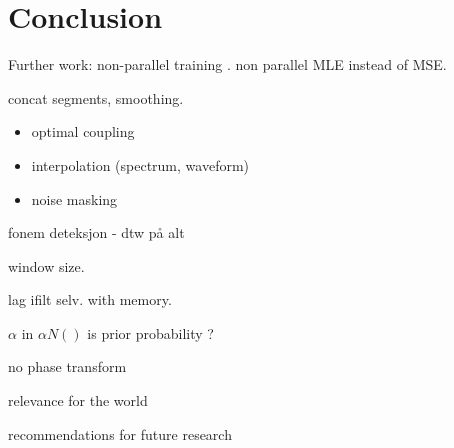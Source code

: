\chapter{Conclusion} %
\label{cha:conclusion}
Further work: non-parallel training \cite{mouchtaris06}. non parallel \cite{ye06} MLE instead of MSE.

concat segments, smoothing.
\begin{itemize}
	\item optimal coupling
	\item interpolation (spectrum, waveform)
	\item noise masking
\end{itemize}

fonem deteksjon - dtw på alt

window size.


lag ifilt selv. with memory.


$\alpha$ in $\alpha N()$ is prior probability ?


no phase transform


relevance for the world

recommendations for future research
